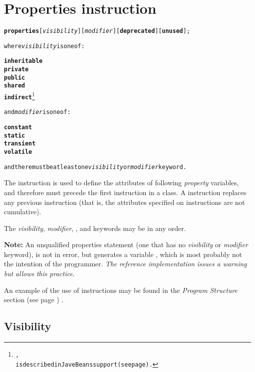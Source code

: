 \chapter{Properties instruction}\label{refprop}
\begin{shaded}
\begin{alltt}
\textbf{properties} [\emph{visibility}] [\emph{modifier}] [\textbf{deprecated}] [\textbf{unused}];

where \emph{visibility} is one of:

    \textbf{inheritable}
    \textbf{private}
    \textbf{public}
    \textbf{shared}
    \textbf{indirect}\footnote{
,
is described in JaveBeans support (see page \pageref{refappb}) .
}


and \emph{modifier} is one of:

    \textbf{constant}
    \textbf{static}
    \textbf{transient}
    \textbf{volatile}

and there must be at least one \emph{visibility} or \emph{modifier} keyword.
\end{alltt}
\end{shaded}
 
The  instruction is used to define the attributes
of following \emph{property} variables, and therefore must precede the
first  instruction in a class.
A  instruction replaces any previous
 instruction (that is, the attributes specified on
 instructions are not cumulative).
 
The \emph{visibility}, \emph{modifier},
, and  keywords may be in any
order.

\begin{shaded}\noindent
\textbf{Note:} An unqualified properties statement (one that has no
\emph{visibility} or \emph{modifier} keyword), is not in error, but
generates a variable , which is most probably not
the intention of the
programmer. \emph{The reference
  implementation issues a warning but allows this practice}.
\end{shaded}
 
An example of the use of  instructions may be
found in the  \emph{Program Structure} section (see page \pageref{refpstruct}) .
\section{Visibility}
 
